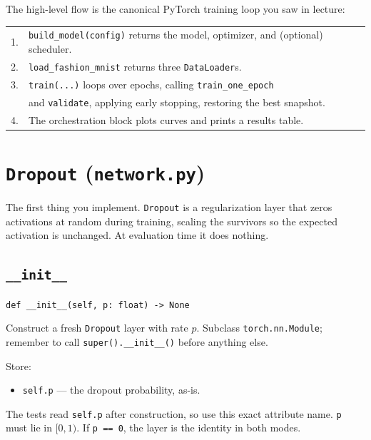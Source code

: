 \documentclass[11pt]{article}
\newcommand{\code}[1]{\texttt{\small #1}}
\begin{document}
\medskip
\noindent
The high-level flow is the canonical PyTorch training loop you saw in lecture:

\begin{center}
\begin{tabular}{ll}
1. & \code{build\_model(config)} returns the model, optimizer, and (optional) scheduler. \\
2. & \code{load\_fashion\_mnist} returns three \code{DataLoader}s. \\
3. & \code{train(...)} loops over epochs, calling \code{train\_one\_epoch} \\
   & and \code{validate}, applying early stopping, restoring the best snapshot. \\
4. & The orchestration block plots curves and prints a results table.
\end{tabular}
\end{center}

\section{\texttt{Dropout} (\texttt{network.py})}

The first thing you implement. \code{Dropout} is a regularization layer that
zeros activations at random during training, scaling the survivors so the
expected activation is unchanged. At evaluation time it does nothing.

\subsection{\texttt{\_\_init\_\_}}

\noindent
\code{def \_\_init\_\_(self, p: float) -> None}

\medskip\noindent
Construct a fresh \code{Dropout} layer with rate $p$. Subclass
\code{torch.nn.Module}; remember to call \code{super().\_\_init\_\_()} before
anything else.

\medskip\noindent
Store:
\begin{itemize}
    \item \code{self.p} --- the dropout probability, as-is.
\end{itemize}

The tests read \code{self.p} after construction, so use this exact attribute
name. \code{p} must lie in $[0, 1)$. If \code{p == 0}, the layer is the
identity in both modes.
\end{document}
